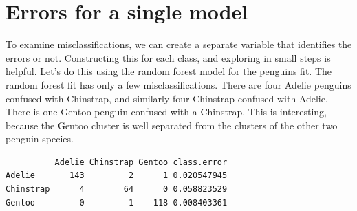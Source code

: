 \documentclass[
  letterpaper,
]{krantz}
\newenvironment{Shaded}{\begin{snugshade}}{\end{snugshade}}
\newcommand{\AttributeTok}[1]{\textcolor[rgb]{0.40,0.45,0.13}{#1}}
\newcommand{\DecValTok}[1]{\textcolor[rgb]{0.68,0.00,0.00}{#1}}
\newcommand{\FunctionTok}[1]{\textcolor[rgb]{0.28,0.35,0.67}{#1}}
\newcommand{\NormalTok}[1]{\textcolor[rgb]{0.00,0.23,0.31}{#1}}
\newcommand{\OtherTok}[1]{\textcolor[rgb]{0.00,0.23,0.31}{#1}}
\newcommand{\SpecialCharTok}[1]{\textcolor[rgb]{0.37,0.37,0.37}{#1}}
\begin{document}
\section{Errors for a single model}\label{sec-class-errorr}

To examine misclassifications, we can create a separate variable that
identifies the errors or not. Constructing this for each class, and
exploring in small steps is helpful. Let's do this using the random
forest model for the penguins fit. The random forest fit has only a few
misclassifications. There are four Adelie penguins confused with
Chinstrap, and similarly four Chinstrap confused with Adelie. There is
one Gentoo penguin confused with a Chinstrap. This is interesting,
because the Gentoo cluster is well separated from the clusters of the
other two penguin species. 


\begin{Shaded}
\end{Shaded}

\begin{verbatim}
          Adelie Chinstrap Gentoo class.error
Adelie       143         2      1 0.020547945
Chinstrap      4        64      0 0.058823529
Gentoo         0         1    118 0.008403361
\end{verbatim}

\begin{Shaded}
\end{Shaded}
\end{document}
